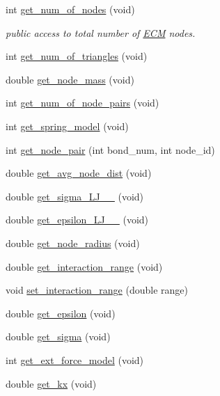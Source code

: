 \begin{DoxyCompactItemize}
int \mbox{\hyperlink{classECM_a6890f319e54f20f6090dff58b95f4459}{get\+\_\+num\+\_\+of\+\_\+nodes}} (void)
\begin{DoxyCompactList}\small\item\em public access to total number of \mbox{\hyperlink{classECM}{E\+CM}} nodes. \end{DoxyCompactList}\item 
int \mbox{\hyperlink{classECM_a7e30f13a497b78851fa165609c20344b}{get\+\_\+num\+\_\+of\+\_\+triangles}} (void)
\item 
double \mbox{\hyperlink{classECM_a5ae07f6f6a367dc6ebac42387ad8edd2}{get\+\_\+node\+\_\+mass}} (void)
\item 
int \mbox{\hyperlink{classECM_aadeaefad8e0e1ca296249ed4c8a5ade9}{get\+\_\+num\+\_\+of\+\_\+node\+\_\+pairs}} (void)
\item 
int \mbox{\hyperlink{classECM_ab45a4d7d1d71a4bd6ca1403f9d794203}{get\+\_\+spring\+\_\+model}} (void)
\item 
int \mbox{\hyperlink{classECM_a97b1c4fbfa1158752369ed3e1c8f2f59}{get\+\_\+node\+\_\+pair}} (int bond\+\_\+num, int node\+\_\+id)
\item 
double \mbox{\hyperlink{classECM_ab8d8c6f37cbbf963cad176bfd5c45658}{get\+\_\+avg\+\_\+node\+\_\+dist}} (void)
\item 
double \mbox{\hyperlink{classECM_a9116e5b74b658291d070c03f0a74715c}{get\+\_\+sigma\+\_\+\+L\+J\+\_\+\_}} (void)
\item 
double \mbox{\hyperlink{classECM_a740df2034bc69bb26c6ba1780f644329}{get\+\_\+epsilon\+\_\+\+L\+J\+\_\+\_}} (void)
\item 
double \mbox{\hyperlink{classECM_a59c396242e1f2a7992bcb3744c27d280}{get\+\_\+node\+\_\+radius}} (void)
\item 
double \mbox{\hyperlink{classECM_af36525691755fc391410e3784fe44113}{get\+\_\+interaction\+\_\+range}} (void)
\item 
void \mbox{\hyperlink{classECM_a9c4ea9febf2771ef222cd1430c3bf136}{set\+\_\+interaction\+\_\+range}} (double range)
\item 
double \mbox{\hyperlink{classECM_a0ce08b5de6aebfe790a0a6a9967d832c}{get\+\_\+epsilon}} (void)
\item 
double \mbox{\hyperlink{classECM_ab955084115d90d0410add1906b4efe85}{get\+\_\+sigma}} (void)
\item 
int \mbox{\hyperlink{classECM_a574b314f8234976b729ba5cc75b8c29c}{get\+\_\+ext\+\_\+force\+\_\+model}} (void)
\item 
double \mbox{\hyperlink{classECM_a61ec0379672113efba08c9b946e42c8a}{get\+\_\+kx}} (void)

\end{DoxyCompactItemize}
